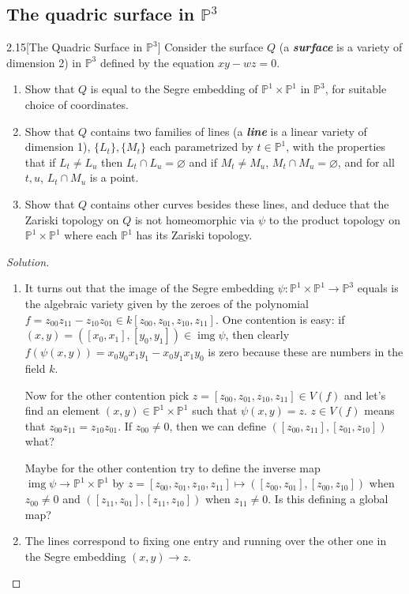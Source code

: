 \subsection{The quadric surface in $\mathbb{P}^3$}

\begin{manualexercise}{2.15}[The Quadric Surface in $\mathbb{P}^3$]
	Consider the surface $Q$ (a \textbf{\textit{surface}} is a variety of dimension 2) in $\mathbb{P}^3$ defined by the equation $xy-wz=0$.
	\begin{enumerate}
		\item Show that $Q$ is equal to the Segre embedding of $\mathbb{P}^1\times\mathbb{P}^1$ in $\mathbb{P}^3$, for suitable choice of coordinates.
		\item Show that $Q$ contains two families of lines (a \textbf{\textit{line}} is a linear variety of dimension 1), $\{L_t\},\{M_t\}$ each parametrized by $t\in\mathbb{P}^1$, with the properties that if $L_t\neq L_u$ then $L_t\cap L_u=\varnothing$ and if $M_t\neq M_u$, $M_t\cap M_u=\varnothing$, and for all $t,u$, $L_t\cap M_u$ is a point.
		\item Show that $Q$ contains other curves besides these lines, and deduce that the Zariski topology on $Q$ is not homeomorphic via $\psi$ to the product topology on $\mathbb{P}^1\times \mathbb{P}^1$ where each $\mathbb{P}^1$ has its Zariski topology.
	\end{enumerate}
\end{manualexercise}

\begin{proof}[Solution]\leavevmode
	\begin{enumerate}
		\item It turns out that the image of the Segre embedding $\psi:\mathbb{P}^1\times\mathbb{P}^1\to\mathbb{P}^3$ equals is the algebraic variety given by the zeroes of the polynomial $f=z_{00}z_{11}-z_{10}z_{01}\in k[z_{00},z_{01},z_{10},z_{11}]$. One contention is easy: if $(x,y)=([x_0,x_1],[y_0,y_1])\in\operatorname{img}\psi$, then clearly $f(\psi(x,y))=x_0y_0x_1y_1-x_0y_1x_1y_0$ is zero because these are numbers in the field $k$.
		
		Now for the other contention pick $z=[z_{00},z_{01},z_{10},z_{11}]\in V(f)$ and let's find an element $(x,y)\in\mathbb{P}^1\times\mathbb{P}^1$ such that $\psi(x,y)=z$. $z\in V(f)$ means that $z_{00}z_{11}=z_{10}z_{01}$. If $z_{00}\neq0$, then we can define $([z_{00},z_{11}],[z_{01},z_{10}])$ {\color{magenta}what?}
		
		Maybe for the other contention try to define the inverse map $\operatorname{img}\psi\to\mathbb{P}^1\times\mathbb{P}^1$ by $z=[z_{00},z_{01},z_{10},z_{11}]\mapsto([z_{00},z_{01}],[z_{00},z_{10}])$ when $z_{00}\neq0$ and $([z_{11},z_{01}],[z_{11},z_{10}])$ when $z_{11}\neq0$. Is this defining a global map?
		
		\item The lines correspond to fixing one entry and running over the other one in the Segre embedding $(x,y)\to z$. 
	\end{enumerate}
\end{proof}

